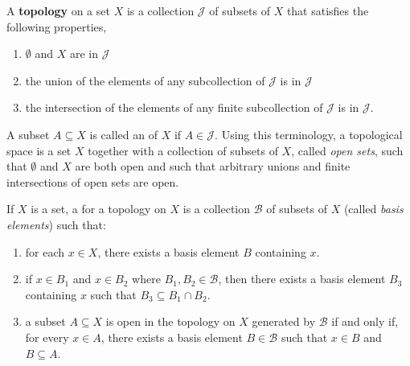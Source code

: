 \begin{definition}
A \textbf{topology} on a set $X$ is a collection $\mathcal{J}$ of subsets of $X$ that satisfies the following properties,
\begin{enumerate}
\item $\emptyset$ and $X$ are in $\mathcal{J}$
\item the union of the elements of any subcollection of $\mathcal{J}$ is in $\mathcal{J}$
\item the intersection of the elements of any finite subcollection of $\mathcal{J}$ is in $\mathcal{J}$.
\end{enumerate}
\end{definition}

A subset $A \subseteq X$ is called an  of $X$ if $A \in \mathcal{J}$.
Using this terminology, a topological space is a set $X$ together with a collection of subsets of $X$, called \emph{open sets}, such that $\emptyset$ and $X$ are both open and such that arbitrary unions and finite intersections of open sets are open.

\begin{definition}
\label{definition:topology_basis}
If $X$ is a set, a  for a topology on $X$ is a collection $\mathcal{B}$ of subsets of $X$ (called \emph{basis elements}) such that:
\begin{enumerate}
\item for each $x \in X$, there exists a basis element $B$ containing $x$.
\item if $x \in B_1$ and $x \in B_2$ where $B_1, B_2 \in \mathcal{B}$, then there exists a basis element $B_3$ containing $x$ such that $B_3 \subseteq B_1 \cap B_2$.
\item a subset $A \subseteq X$ is open in the topology on $X$ generated by $\mathcal{B}$ if and only if, for every $x \in A$, there exists a basis element $B \in \mathcal{B}$ such that $x \in B$ and $B \subseteq A$.
\end{enumerate}
\end{definition}


